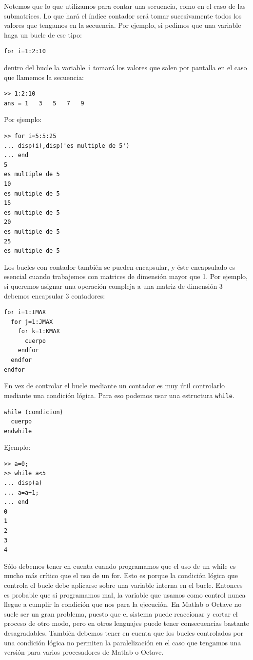 Notemos que lo que utilizamos para contar una secuencia, como en el
caso de las submatrices. Lo que hará el índice contador será tomar
sucesivamente todos los valores que tengamos en la secuencia. Por
ejemplo, si pedimos que una variable haga un bucle de ese tipo:

\begin{lstlisting}
for i=1:2:10
\end{lstlisting}
dentro del bucle la variable \texttt{i} tomará los valores que salen
por pantalla en el caso que llamemos la secuencia:

\begin{lstlisting}
>> 1:2:10
ans = 1   3   5   7   9
\end{lstlisting}

Por ejemplo:
\begin{lstlisting}
>> for i=5:5:25
... disp(i),disp('es multiple de 5')
... end
5
es multiple de 5
10
es multiple de 5
15
es multiple de 5
20
es multiple de 5
25
es multiple de 5
\end{lstlisting}


Los bucles con contador también se pueden encapsular, y éste
encapsulado es esencial cuando trabajemos con matrices de dimensión
mayor que 1. Por ejemplo, si queremos asignar una operación compleja a
una matriz de dimensión  3 debemos encapsular 3 contadores:

\begin{lstlisting}
for i=1:IMAX   
  for j=1:JMAX   
    for k=1:KMAX   
      cuerpo   
    endfor   
  endfor   
endfor
\end{lstlisting}



En vez de controlar el bucle mediante un contador es muy útil
controlarlo mediante una condición lógica. Para eso podemos usar una
estructura \texttt{while}.

\begin{lstlisting}
while (condicion)   
  cuerpo   
endwhile
\end{lstlisting}

Ejemplo:
\begin{lstlisting}
>> a=0;
>> while a<5
... disp(a)
... a=a+1;
... end
0
1
2
3
4
\end{lstlisting}

Sólo debemos tener en cuenta cuando programamos que el uso de un while
es mucho más crítico que el uso de un for. Esto es porque la condición
lógica que controla el bucle debe aplicarse sobre una variable interna
en el bucle. Entonces es probable que si programamos mal, la variable
que usamos como control nunca llegue a cumplir la condición que nos
para la ejecución. En Matlab o Octave no suele ser un gran problema,
puesto que el sistema puede reaccionar y cortar el proceso de otro
modo, pero en otros lenguajes puede tener consecuencias bastante
desagradables.  También debemos tener en cuenta que los bucles
controlados por una condición lógica no permiten la paralelización en
el caso que tengamos una versión para varios procesadores de Matlab o
Octave.

